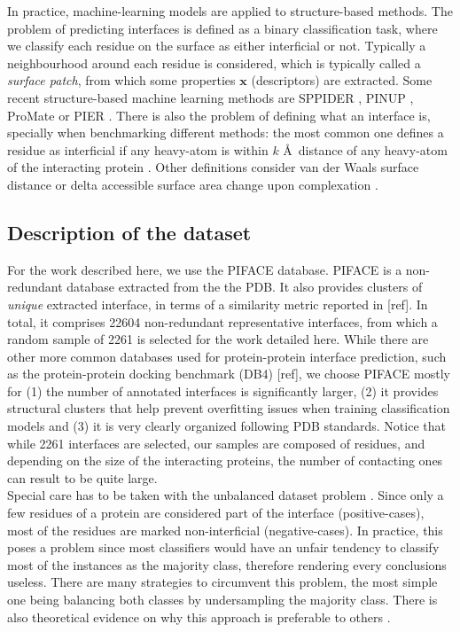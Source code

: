 \documentclass[10pt,a4paper,twoside]{book}
\begin{document}
In practice, machine-learning models are applied to structure-based methods. The problem of predicting interfaces is defined as a binary classification task, where we classify each residue on the surface as either interficial or not. Typically a neighbourhood around each residue is considered, which is typically called a \textit{surface patch}, from which some properties $\boldsymbol{x}$ (descriptors) are extracted. Some recent structure-based machine learning methods are SPPIDER \cite{Porollo2007}, PINUP \cite{Liang2006}, ProMate \cite{Neuvirth2004} or PIER \cite{Kufareva2007}. There is also the problem of defining what an interface is, specially when benchmarking different methods: the most common one defines a residue as interficial if any heavy-atom is within $k$ \AA\ distance of any heavy-atom of the interacting protein \cite{AfsarMinhas2014}. Other definitions consider van der Waals surface distance \cite{Jordan2012} or delta accessible surface area change upon complexation \cite{Jones1997}.

\subsection{Description of the dataset}

For the work described here, we use the PIFACE \cite{Cukuroglu2014} database. PIFACE is a non-redundant database extracted from the the PDB. It also provides clusters of \textit{unique} extracted interface, in terms of a similarity metric reported in [ref]. In total, it comprises 22604 non-redundant representative interfaces, from which a random sample of 2261 is selected for the work detailed here. While there are other more common databases used for protein-protein interface prediction, such as the protein-protein docking benchmark (DB4) [ref], we choose PIFACE mostly for (1) the number of annotated interfaces is significantly larger, (2) it provides structural clusters that help prevent overfitting issues when training classification models and (3) it is very clearly organized following PDB standards. Notice that while 2261 interfaces are selected, our samples are composed of residues, and depending on the size of the interacting proteins, the number of contacting ones can result to be quite large.\\

Special care has to be taken with the unbalanced dataset problem \cite{Longadge2013}. Since only a few residues of a protein are considered part of the interface (positive-cases), most of the residues are marked non-interficial (negative-cases). In practice, this poses a problem since most classifiers would have an unfair tendency to classify most of the instances as the majority class, therefore rendering every conclusions useless. There are many strategies to circumvent this problem, the most simple one being balancing both classes by undersampling the majority class. There is also theoretical evidence on why this approach is preferable to others \cite{Wallace2011}.  \\ 
\end{document}
